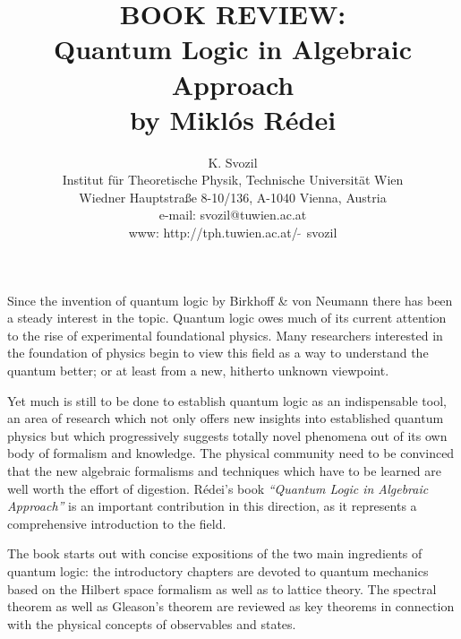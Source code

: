 

 \def\Bbb{\bf }

\title{BOOK REVIEW:\\
       Quantum Logic in Algebraic Approach\\
       by Mikl{\'{o}}s R{\'{e}}dei\\}
\author{K. Svozil\\
 {\small Institut f\"ur Theoretische Physik,}
  {\small Technische Universit\"at Wien }     \\
  {\small Wiedner Hauptstra\ss e 8-10/136,}
  {\small A-1040 Vienna, Austria   }            \\
  {\small e-mail: svozil@tuwien.ac.at}\\
  {\small www: http://tph.tuwien.ac.at/$\widetilde{\;\;}\,$svozil}}
\date{ }
\maketitle

Since the invention of quantum logic by Birkhoff \&
von Neumann there has been a steady interest in the
topic. Quantum logic owes much of its current attention to the rise of
experimental foundational physics. Many researchers interested in the
foundation of
physics begin to view this field as a way to understand the quantum
better; or at least from a new, hitherto unknown viewpoint.

Yet  much
is still to be done to establish quantum logic
as an indispensable tool, an area
of research which not only offers new insights into established
quantum
physics but which progressively suggests totally novel phenomena
out of its own body of formalism and
knowledge.
The  physical community need to be convinced
that the new algebraic formalisms and techniques which have to
be learned are well worth the effort of digestion.
R{\'{e}}dei's book
{\it ``Quantum Logic in Algebraic Approach''} \cite{redei} is
an important contribution in this direction, as it represents a
comprehensive introduction to the field.

The book starts out with concise expositions of the two main ingredients of
quantum logic: the introductory chapters are devoted to  quantum
mechanics  based on the Hilbert space formalism as well as to lattice
theory. The spectral theorem as well as Gleason's theorem are reviewed
as key theorems in connection with the physical concepts of observables
and states.

